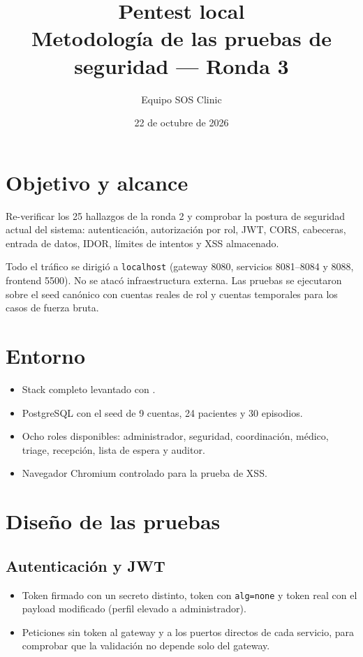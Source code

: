 \documentclass[11pt]{article}
\title{\textbf{Pentest local}\\[0.3em]
\large Metodología de las pruebas de seguridad --- Ronda 3}
\author{Equipo SOS Clinic}
\date{22 de octubre de 2026}
\begin{document}
\maketitle

\section{Objetivo y alcance}

Re-verificar los 25 hallazgos de la ronda 2 y comprobar la postura de seguridad
actual del sistema: autenticación, autorización por rol, JWT, CORS, cabeceras,
entrada de datos, IDOR, límites de intentos y XSS almacenado.

Todo el tráfico se dirigió a \texttt{localhost} (gateway 8080, servicios
8081--8084 y 8088, frontend 5500). No se atacó infraestructura externa. Las
pruebas se ejecutaron sobre el seed canónico con cuentas reales de rol y
cuentas temporales para los casos de fuerza bruta.

\section{Entorno}

\begin{itemize}
  \item Stack completo levantado con .
  \item PostgreSQL con el seed de 9 cuentas, 24 pacientes y 30 episodios.
  \item Ocho roles disponibles: administrador, seguridad, coordinación,
  médico, triage, recepción, lista de espera y auditor.
  \item Navegador Chromium controlado para la prueba de XSS.
\end{itemize}

\section{Diseño de las pruebas}

\subsection{Autenticación y JWT}

\begin{itemize}
  \item Token firmado con un secreto distinto, token con \texttt{alg=none} y
  token real con el payload modificado (perfil elevado a administrador).
  \item Peticiones sin token al gateway y a los puertos directos de cada
  servicio, para comprobar que la validación no depende solo del gateway.
\end{itemize}
\end{document}
